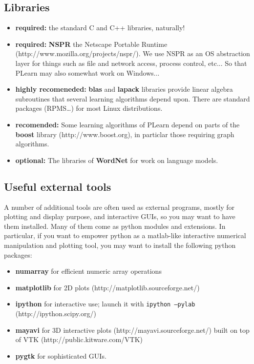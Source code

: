 \documentclass[11pt]{book}
\begin{document}
\subsection{Libraries}

\begin{itemize}
\item {\bf required:} the standard C and C++ libraries, naturally!
\item {\bf required:} {\bf NSPR} the Netscape Portable Runtime
  (http://www.mozilla.org/projects/nspr/). We use NSPR as an OS abstraction
  layer for things such as file and network access, process control, etc...
So that PLearn may also somewhat work on Windows...
\item {\bf highly recomeneded:} {\bf blas} and {\bf lapack} libraries provide linear algebra
  subroutines that several learning algorithms depend upon. There are standard
  packages (RPMS\ldots) for most Linux distributions.
\item {\bf recomended:} Some learning algorithms of PLearn depend on parts
  of the {\bf boost} library (http://www.boost.org), in particlar those
  requiring graph algorithms.
\item {\bf optional:} The libraries of {\bf WordNet} for work on language models.
\end{itemize}

\subsection{Useful external tools}

A number of additional tools are often used as external programs, mostly for plotting and
display purpose, and interactive GUIs, so you may want to have them installed. 
Many of them come as python modules and extensions. In particular, if you
want to empower python as a matlab-like interactive numerical manipulation
and plotting tool, you may want to install the following python packages:

\begin{itemize}
\item {\bf numarray} for efficient numeric array operations
\item {\bf matplotlib} for 2D plots (http://matplotlib.sourceforge.net/)
\item {\bf ipython} for interactive use; launch it with {\tt ipython --pylab} (http://ipython.scipy.org/) 
\item {\bf mayavi} for 3D interactive plots (http://mayavi.sourceforge.net/) built on top of VTK (http://public.kitware.com/VTK)
\item {\bf pygtk} for sophisticated GUIs.
\end{itemize}
\end{document}
